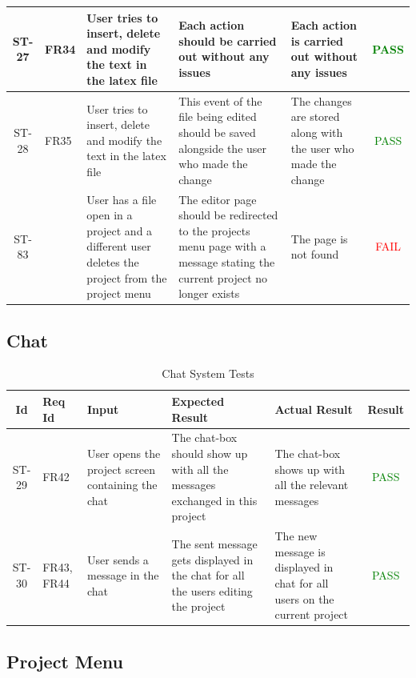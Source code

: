 \documentclass[12pt, titlepage]{article}
\begin{document}
\begin{center}
\begin{longtable}{|c|p{1cm}|p{2.7cm}|p{3cm}|p{3cm}|c|}
			\hline
			ST-27 & FR34 & User tries to insert, delete and modify the text in the latex file & Each action should be carried out without any issues & Each action is carried out without any issues & \textcolor{green}{PASS} \\
			\hline
			ST-28 & FR35 & User tries to insert, delete and modify the text in the latex file & This event of the file being edited should be saved alongside the user who made the change & The changes are stored along with the user who made the change & \textcolor{green}{PASS} \\
			\hline
			ST-83 &  & User has a file open in a project and a different user deletes the project from the project menu & The editor page should be redirected to the projects menu page with a message stating the current project no longer exists & The page is not found & \textcolor{red}{FAIL} \\
			\hline
		\end{longtable}
	\end{center}
	
	\subsection{Chat}
	
	\begin{center}
		\begin{longtable}{|c|p{1cm}|p{2.7cm}|p{3cm}|p{3cm}|c|}
			\caption{Chat System Tests \label{long}}\\
			\hline
			\textbf{Id} & \textbf{Req Id} & \textbf{Input} & \textbf{Expected Result} & \textbf{Actual Result} & \textbf{Result}   \\
			\hline
			ST-29 & FR42 & User opens the project screen containing the chat & The chat-box should show up with all the messages exchanged in this project & The chat-box shows up with all the relevant messages &  \textcolor{green}{PASS} \\
			\hline
			ST-30 & FR43, FR44 & User sends a message in the chat & The sent message gets displayed in the chat for all the users editing the project & The new message is displayed in chat for all users on the current project &  \textcolor{green}{PASS} \\
			\hline
		\end{longtable}
	\end{center}
	
	\subsection{Project Menu}
	
\end{document}
